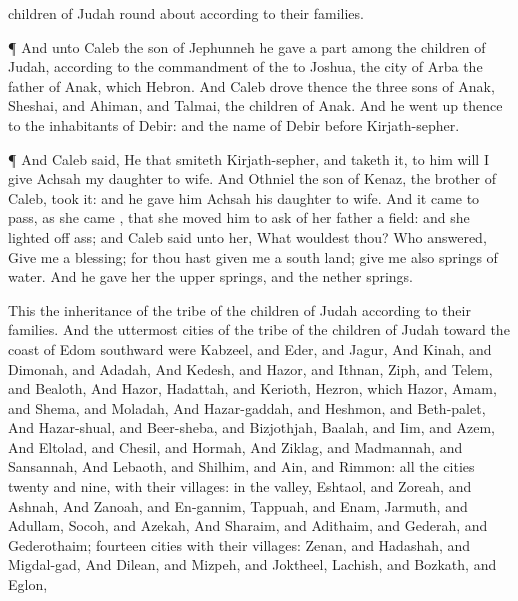 {children of
Judah round
about according to their
families.
\par }{\PP {}¶ And unto
Caleb the
son of
Jephunneh he
gave a
part
among the
children of
Judah,
according to the
commandment of the
{} to
Joshua,
{} the
city of
Arba the
father of
Anak, which
{}
Hebron.
And
Caleb
drove thence the
three
sons of
Anak,
Sheshai, and
Ahiman, and
Talmai, the
children of
Anak.
And he went
up thence to the
inhabitants of
Debir: and the
name of
Debir
before
{}
Kirjath-sepher.
\par }{\PP {}¶ And
Caleb
said, He that
smiteth
Kirjath-sepher, and
taketh it, to him will I
give
Achsah my
daughter to
wife.
And
Othniel the
son of
Kenaz, the
brother of
Caleb,
took it: and he
gave him
Achsah his
daughter to
wife.
And it came to pass, as she
came
{}, that she
moved him to
ask of her
father a
field: and she lighted
off
{}
ass; and
Caleb
said unto her, What wouldest thou?
Who
answered,
Give me a
blessing; for thou hast
given me a
south
land;
give me also
springs of
water. And he
gave her the
upper
springs, and the
nether
springs.
\par }{\PP {}This
{} the
inheritance of the
tribe of the
children of
Judah according to their
families.
And the
uttermost
cities of the
tribe of the
children of
Judah toward the
coast of
Edom
southward were
Kabzeel, and
Eder, and
Jagur,
And
Kinah, and
Dimonah, and
Adadah,
And
Kedesh, and
Hazor, and
Ithnan,
Ziph, and
Telem, and
Bealoth,
And
Hazor,
Hadattah, and
Kerioth,
{}
Hezron, which
{}
Hazor,
Amam, and
Shema, and
Moladah,
And
Hazar-gaddah, and
Heshmon, and
Beth-palet,
And
Hazar-shual, and
Beer-sheba, and
Bizjothjah,
Baalah, and
Iim, and
Azem,
And
Eltolad, and
Chesil, and
Hormah,
And
Ziklag, and
Madmannah, and
Sansannah,
And
Lebaoth, and
Shilhim, and
Ain, and
Rimmon: all the
cities
{}
twenty and
nine, with their
villages:
 in the
valley,
Eshtaol, and
Zoreah, and
Ashnah,
And
Zanoah, and
En-gannim,
Tappuah, and
Enam,
Jarmuth, and
Adullam,
Socoh, and
Azekah,
And
Sharaim, and
Adithaim, and
Gederah, and
Gederothaim;
fourteen
cities with their
villages:
Zenan, and
Hadashah, and
Migdal-gad,
And
Dilean, and
Mizpeh, and
Joktheel,
Lachish, and
Bozkath, and
Eglon,
}
